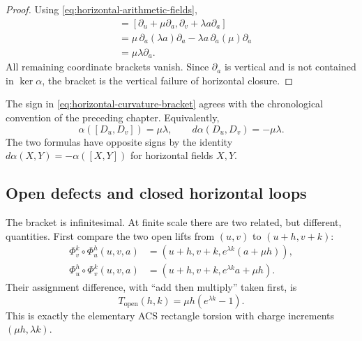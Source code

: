 \begin{proof}
Using \eqref{eq:horizontal-arithmetic-fields},
\begin{align*}
    [D_u,D_v]
      &=[\partial_u+\mu\partial_a,
          \partial_v+\lambda a\partial_a]\\
      &=\mu\,\partial_a(\lambda a)\partial_a
        -\lambda a\,\partial_a(\mu)\partial_a\\
      &=\mu\lambda\partial_a.
\end{align*}
All remaining coordinate brackets vanish.  Since \(\partial_a\) is vertical
and is not contained in \(\ker\alpha\), the bracket is the vertical failure of
horizontal closure.
\end{proof}

The sign in \eqref{eq:horizontal-curvature-bracket} agrees with the
chronological convention of the preceding chapter.  Equivalently,
\[
    \alpha([D_u,D_v])=\mu\lambda,
    \qquad
    d\alpha(D_u,D_v)=-\mu\lambda.
\]
The two formulas have opposite signs by the identity
\(d\alpha(X,Y)=-\alpha([X,Y])\) for horizontal fields \(X,Y\).

\subsection{Open defects and closed horizontal loops}

The bracket is infinitesimal.  At finite scale there are two related, but
different, quantities.  First compare the two open lifts from \((u,v)\) to
\((u+h,v+k)\):
\begin{align*}
    \Phi_v^k\circ\Phi_u^h(u,v,a)
      &=(u+h,v+k,e^{\lambda k}(a+\mu h)),\\
    \Phi_u^h\circ\Phi_v^k(u,v,a)
      &=(u+h,v+k,e^{\lambda k}a+\mu h).
\end{align*}
Their assignment difference, with ``add then multiply'' taken first, is
\begin{equation}
    T_{\mathrm{open}}(h,k)
      =\mu h(e^{\lambda k}-1).
    \label{eq:exact-open-contact-defect}
\end{equation}
This is exactly the elementary ACS rectangle torsion with charge increments
\((\mu h,\lambda k)\).

